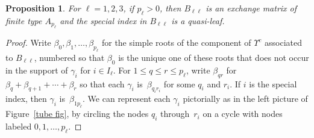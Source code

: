 \documentclass{amsart}
\newtheorem{proposition}{Proposition}[section]
\theoremstyle{definition}
\theoremstyle{remark}
\numberwithin{equation}{section}
\newcommand{\0}{{\mathbf{0}}}
\newcommand{\RSTChar}{\Upsilon}
\newcommand{\RST}[1]{\RSTChar^{#1}}
\begin{document}
\begin{proposition}\label{A and q-l}
For $\ell=1,2,3$, if $p_\ell>0$, then $B_{\ell\ell}$ is an exchange matrix of finite type $A_{p_\ell}$ and the special index in $B_{\ell\ell}$ is a quasi-leaf.
\end{proposition}
\begin{proof}
Write $\beta_0,\beta_1,\ldots,\beta_{p_\ell}$ for the simple roots of the component of $\RST{c}$ associated to $B_{\ell\ell}$, numbered so that $\beta_0$ is the unique one of these roots that does not occur in the support of $\gamma_i$ for $i\in I_\ell$.
For $1\le q\le r\le p_\ell$, write $\beta_{qr}$ for $\beta_q+\beta_{q+1}+\cdots+\beta_{r}$ so that each $\gamma_i$ is~$\beta_{q_ir_i}$ for some $q_i$ and $r_i$.
If $i$ is the special index, then $\gamma_i$ is~$\beta_{1p_\ell}$.
We can represent each $\gamma_i$ pictorially as in the left picture of Figure~\ref{tube fig}, by circling the nodes $q_i$ through~$r_i$ on a cycle with nodes labeled $0,1,\ldots,p_\ell$.


\end{proof}
\end{document}

